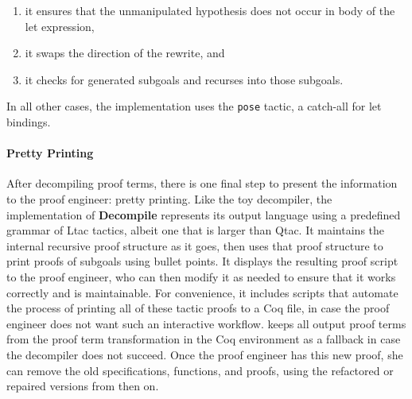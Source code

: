 \begin{enumerate}
\item it ensures that the unmanipulated hypothesis does not occur in body of the let expression,
\item it swaps the direction of the rewrite, and
\item it checks for generated subgoals and recurses into those subgoals.
\end{enumerate}
In all other cases, the implementation uses the \lstinline{pose} tactic, a catch-all for let bindings.

\paragraph{Pretty Printing}
After decompiling proof terms, there is one final step to present the information to the proof engineer: pretty printing.
Like the toy decompiler, the implementation of \textbf{Decompile} represents its output language using a predefined grammar of Ltac tactics,
albeit one that is larger than Qtac.
It maintains the internal recursive proof structure as it goes, then uses that proof structure to print proofs of subgoals using bullet points.
It displays the resulting proof script to the proof engineer, who can then modify it as needed to ensure that it works correctly
and is maintainable.
For convenience, it includes scripts that automate the process of printing all of these tactic proofs to a Coq file,
in case the proof engineer does not want such an interactive workflow.
\toolname keeps all output proof terms from the proof term transformation in the Coq environment as a fallback in case the decompiler does not succeed.
Once the proof engineer has this new proof, she can remove the old specifications, functions, and proofs, using the refactored or repaired
versions from then on.


